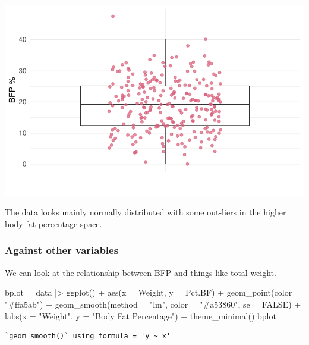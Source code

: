 \documentclass[
  letterpaper,
  DIV=11,
  numbers=noendperiod]{scrartcl}
\newenvironment{Shaded}{\begin{snugshade}}{\end{snugshade}}
\newcommand{\AttributeTok}[1]{\textcolor[rgb]{0.40,0.45,0.13}{#1}}
\newcommand{\ConstantTok}[1]{\textcolor[rgb]{0.56,0.35,0.01}{#1}}
\newcommand{\FunctionTok}[1]{\textcolor[rgb]{0.28,0.35,0.67}{#1}}
\newcommand{\NormalTok}[1]{\textcolor[rgb]{0.00,0.23,0.31}{#1}}
\newcommand{\OtherTok}[1]{\textcolor[rgb]{0.00,0.23,0.31}{#1}}
\newcommand{\SpecialCharTok}[1]{\textcolor[rgb]{0.37,0.37,0.37}{#1}}
\newcommand{\StringTok}[1]{\textcolor[rgb]{0.13,0.47,0.30}{#1}}
\begin{document}
\includegraphics{Untitled_files/figure-pdf/unnamed-chunk-5-1.pdf}

The data looks mainly normally distributed with some out-liers in the
higher body-fat percentage space.

\subsubsection{Against other variables}\label{against-other-variables}

We can look at the relationship between BFP and things like total
weight.

\begin{Shaded}
\begin{Highlighting}[]
\NormalTok{bplot }\OtherTok{=}\NormalTok{ data }\SpecialCharTok{|\textgreater{}}
  \FunctionTok{ggplot}\NormalTok{() }\SpecialCharTok{+} \FunctionTok{aes}\NormalTok{(}\AttributeTok{x =}\NormalTok{ Weight, }\AttributeTok{y =}\NormalTok{ Pct.BF) }\SpecialCharTok{+}
  \FunctionTok{geom\_point}\NormalTok{(}\AttributeTok{color =} \StringTok{"\#ffa5ab"}\NormalTok{) }\SpecialCharTok{+}
  \FunctionTok{geom\_smooth}\NormalTok{(}\AttributeTok{method =} \StringTok{"lm"}\NormalTok{, }\AttributeTok{color =} \StringTok{"\#a53860"}\NormalTok{, }\AttributeTok{se =} \ConstantTok{FALSE}\NormalTok{) }\SpecialCharTok{+}
  \FunctionTok{labs}\NormalTok{(}\AttributeTok{x =} \StringTok{"Weight"}\NormalTok{, }\AttributeTok{y =} \StringTok{"Body Fat Percentage"}\NormalTok{) }\SpecialCharTok{+}
  \FunctionTok{theme\_minimal}\NormalTok{()}
\NormalTok{bplot}
\end{Highlighting}
\end{Shaded}

\begin{verbatim}
`geom_smooth()` using formula = 'y ~ x'
\end{verbatim}
\end{document}
